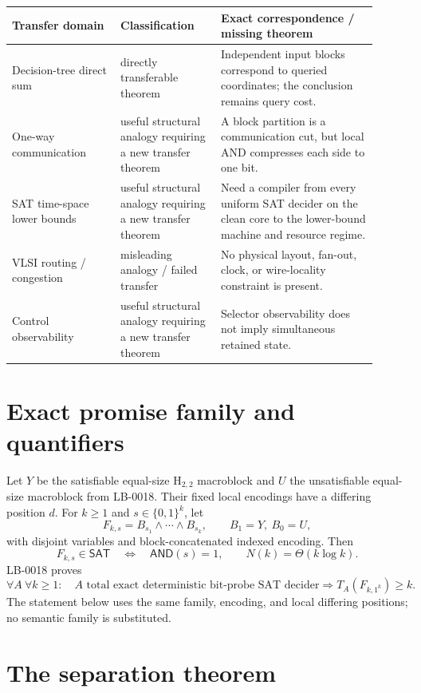 \documentclass[11pt]{article}
\newcommand{\SAT}{\mathsf{SAT}}
\newcommand{\AND}{\mathsf{AND}}
\begin{document}
\begin{center}
\begin{tabular}{p{0.27\linewidth}p{0.25\linewidth}p{0.39\linewidth}}
\toprule
Transfer domain & Classification & Exact correspondence / missing theorem \\
\midrule
Decision-tree direct sum & directly transferable theorem & Independent input
blocks correspond to queried coordinates; the conclusion remains query cost. \\
One-way communication & useful structural analogy requiring a new transfer
theorem & A block partition is a communication cut, but local AND compresses
each side to one bit. \\
SAT time-space lower bounds & useful structural analogy requiring a new transfer
theorem & Need a compiler from every uniform SAT decider on the clean core to
the lower-bound machine and resource regime. \\
VLSI routing / congestion & misleading analogy / failed transfer & No physical
layout, fan-out, clock, or wire-locality constraint is present. \\
Control observability & useful structural analogy requiring a new transfer
theorem & Selector observability does not imply simultaneous retained state. \\
\bottomrule
\end{tabular}
\end{center}

\section{Exact promise family and quantifiers}

Let $Y$ be the satisfiable equal-size H$_{2,2}$ macroblock and $U$ the
unsatisfiable equal-size macroblock from LB-0018.  Their fixed local encodings
have a differing position $d$.  For $k\ge1$ and $s\in\{0,1\}^k$, let
\[
 F_{k,s}=B_{s_1}\wedge\cdots\wedge B_{s_k},\qquad B_1=Y,\ B_0=U,
\]
with disjoint variables and block-concatenated indexed encoding.  Then
\[
 F_{k,s}\in\SAT\quad\Longleftrightarrow\quad \AND(s)=1,
 \qquad N(k)=\Theta(k\log k).
\]
LB-0018 proves
\[
 \forall A\ \forall k\ge1:\quad
 A\text{ total exact deterministic bit-probe SAT decider}
 \Longrightarrow T_A(F_{k,1^k})\ge k.                 \tag{1}
\]
The statement below uses the same family, encoding, and local differing
positions; no semantic family is substituted.

\section{The separation theorem}
\end{document}
